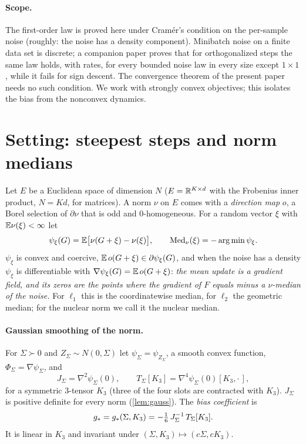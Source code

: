 \documentclass{article}
\theoremstyle{plain}
\theoremstyle{definition}
\theoremstyle{remark}
\begin{document}
\paragraph{Scope.} The first-order law is proved here under Cram\'er's condition on the per-sample noise (roughly:
the noise has a density component). Minibatch noise on a finite data set is discrete; a companion paper
\citep{companionII} proves that for orthogonalized steps the same law holds, with rates, for every bounded noise law in
every size except $1\times1$, while it fails for sign descent. The convergence theorem of the present paper needs no
such condition. We work with strongly convex objectives; this isolates the bias from the nonconvex dynamics.

\section{Setting: steepest steps and norm medians}\label{sec:setting}

Let $E$ be a Euclidean space of dimension $N$ ($E=\mathbb{R}^{K\times d}$ with the Frobenius inner product, $N=Kd$, for
matrices). A norm $\nu$ on $E$ comes with a \emph{direction map} $o$, a Borel selection of $\partial\nu$ that is odd and
$0$-homogeneous. For a random vector $\xi$ with $\mathbb{E}\nu(\xi)<\infty$ let
\[
\psi_\xi(G)=\mathbb{E}\big[\nu(G+\xi)-\nu(\xi)\big],\qquad\operatorname{Med}_\nu(\xi)=-\arg\min\psi_\xi .
\]
$\psi_\xi$ is convex and coercive, $\mathbb{E}\,o(G+\xi)\in\partial\psi_\xi(G)$, and when the noise has a density $\psi_\xi$ is
differentiable with $\nabla\psi_\xi(G)=\mathbb{E}\,o(G+\xi)$: \emph{the mean update is a gradient field, and its zeros are the
points where the gradient of $F$ equals minus a $\nu$-median of the noise.} For $\ell_1$ this is the coordinatewise
median, for $\ell_2$ the geometric median; for the nuclear norm we call it the nuclear median.

\paragraph{Gaussian smoothing of the norm.} For $\Sigma\succ0$ and $Z_\Sigma\sim N(0,\Sigma)$ let
$\psi_\Sigma=\psi_{Z_\Sigma}$, a smooth convex function, $\Phi_\Sigma=\nabla\psi_\Sigma$, and
\begin{equation}\label{eq:JT}
J_\Sigma=\nabla^2\psi_\Sigma(0),\qquad T_\Sigma[K_3]=\nabla^4\psi_\Sigma(0)[K_3,\cdot\,],
\end{equation}
for a symmetric $3$-tensor $K_3$ (three of the four slots are contracted with $K_3$). $J_\Sigma$ is positive definite
for every norm (\cref{lem:gauss}). The \emph{bias coefficient} is
\begin{equation}\label{eq:gs}
g_\ast=g_\ast(\Sigma,K_3)=-\tfrac16\,J_\Sigma^{-1}\,T_\Sigma[K_3].
\end{equation}
It is linear in $K_3$ and invariant under $(\Sigma,K_3)\mapsto(c\Sigma,cK_3)$.
\end{document}
